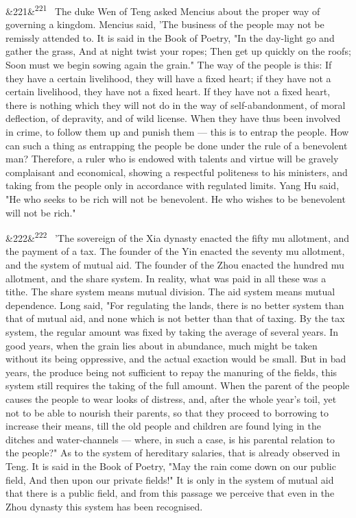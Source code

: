 \documentclass[12pt]{article}
\newcommand{\para}[1][]{\par\noindent\ifx&#1&\else\textsuperscript{\footnotesize #1}~\fi}
\begin{document}
\para[221] The duke Wen of Teng asked Mencius about the proper way of governing a kingdom. Mencius said, 'The business of the people may not be remissly attended to. It is said in the Book of Poetry, "In the day-light go and gather the grass, And at night twist your ropes; Then get up quickly on the roofs; Soon must we begin sowing again the grain." The way of the people is this: If they have a certain livelihood, they will have a fixed heart; if they have not a certain livelihood, they have not a fixed heart. If they have not a fixed heart, there is nothing which they will not do in the way of self-abandonment, of moral deflection, of depravity, and of wild license. When they have thus been involved in crime, to follow them up and punish them --- this is to entrap the people. How can such a thing as entrapping the people be done under the rule of a benevolent man? Therefore, a ruler who is endowed with talents and virtue will be gravely complaisant and economical, showing a respectful politeness to his ministers, and taking from the people only in accordance with regulated limits. Yang Hu said, "He who seeks to be rich will not be benevolent. He who wishes to be benevolent will not be rich."

\para[222] 'The sovereign of the Xia dynasty enacted the fifty mu allotment, and the payment of a tax. The founder of the Yin enacted the seventy mu allotment, and the system of mutual aid. The founder of the Zhou enacted the hundred mu allotment, and the share system. In reality, what was paid in all these was a tithe. The share system means mutual division. The aid system means mutual dependence. Long said, "For regulating the lands, there is no better system than that of mutual aid, and none which is not better than that of taxing. By the tax system, the regular amount was fixed by taking the average of several years. In good years, when the grain lies about in abundance, much might be taken without its being oppressive, and the actual exaction would be small. But in bad years, the produce being not sufficient to repay the manuring of the fields, this system still requires the taking of the full amount. When the parent of the people causes the people to wear looks of distress, and, after the whole year's toil, yet not to be able to nourish their parents, so that they proceed to borrowing to increase their means, till the old people and children are found lying in the ditches and water-channels --- where, in such a case, is his parental relation to the people?" As to the system of hereditary salaries, that is already observed in Teng. It is said in the Book of Poetry, "May the rain come down on our public field, And then upon our private fields!" It is only in the system of mutual aid that there is a public field, and from this passage we perceive that even in the Zhou dynasty this system has been recognised.
\end{document}
